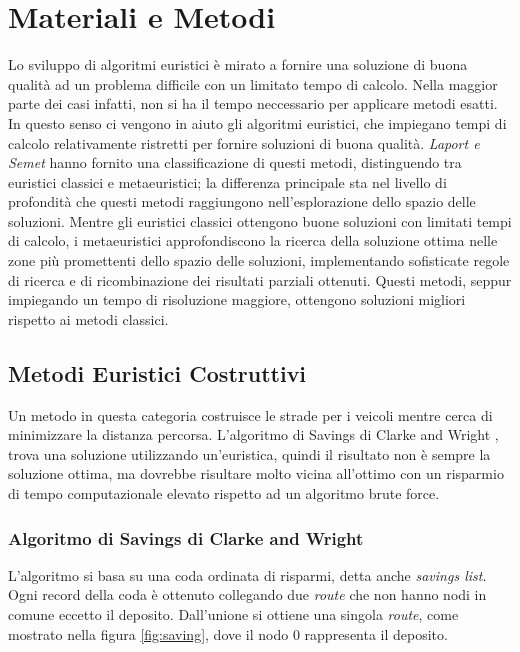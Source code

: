 \documentclass[]{article}
\begin{document}
\section{Materiali e Metodi}
Lo sviluppo di algoritmi euristici è mirato a fornire una soluzione di buona
qualità ad un problema difficile con un limitato tempo di calcolo. Nella
maggior parte dei casi infatti, non si ha il tempo neccessario per applicare
metodi esatti.
In questo senso ci vengono in aiuto gli algoritmi euristici, che impiegano tempi di calcolo relativamente ristretti per fornire soluzioni di
buona qualità. \textit{Laport e Semet} hanno fornito una classificazione di questi metodi, distinguendo tra euristici classici e metaeuristici; la differenza principale sta nel livello di profondità che questi metodi raggiungono
nell’esplorazione dello spazio delle soluzioni. Mentre gli euristici classici
ottengono buone soluzioni con limitati tempi di calcolo, i metaeuristici
approfondiscono la ricerca della soluzione ottima nelle zone più promettenti dello spazio delle soluzioni, implementando sofisticate regole di ricerca e di ricombinazione dei risultati parziali ottenuti. Questi metodi, seppur impiegando un tempo di risoluzione maggiore, ottengono soluzioni migliori rispetto ai metodi classici.
\subsection{Metodi Euristici Costruttivi}
Un metodo in questa categoria costruisce le strade per i veicoli mentre cerca di minimizzare la distanza percorsa.
L'algoritmo di Savings di Clarke and Wright \cite{CK1}, trova una soluzione utilizzando un'euristica, quindi il risultato non è sempre la soluzione ottima, ma dovrebbe risultare molto vicina all'ottimo con un risparmio di tempo computazionale elevato rispetto ad un algoritmo brute force.


\subsubsection{Algoritmo di Savings di Clarke and Wright}
L'algoritmo si basa su una coda ordinata di risparmi, detta anche \emph{savings list}.
Ogni record della coda è ottenuto collegando due \emph{route} che non hanno nodi in comune eccetto il deposito.
Dall'unione si ottiene una singola \emph{route}, come mostrato nella figura \ref{fig:saving}, dove il nodo 0 rappresenta il deposito.
\end{document}
